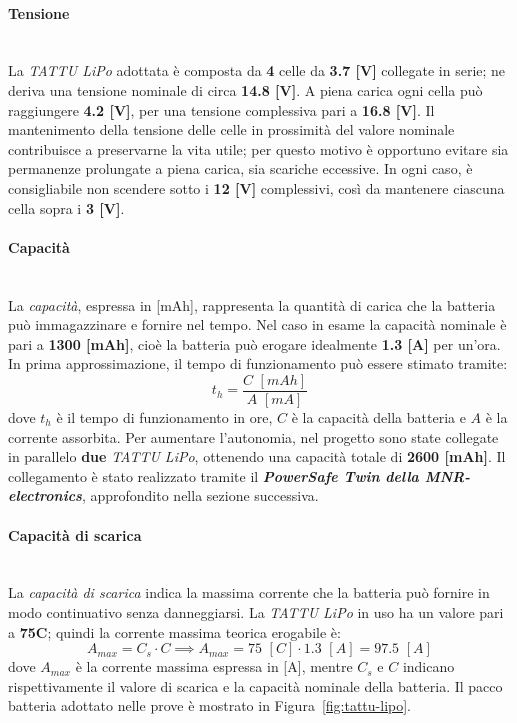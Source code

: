 \documentclass[11pt]{report}
\begin{document}
	\paragraph{\small{Tensione}}\mbox{}\\
	La \textit{TATTU LiPo} adottata è composta da \textbf{4} celle da \textbf{3.7 [V]} collegate in serie; ne deriva una tensione nominale di circa \textbf{14.8 [V]}. A piena carica ogni cella può raggiungere \textbf{4.2 [V]}, per una tensione complessiva pari a \textbf{16.8 [V]}.
	Il mantenimento della tensione delle celle in prossimità del valore nominale contribuisce a preservarne la vita utile; per questo motivo è opportuno evitare sia permanenze prolungate a piena carica, sia scariche eccessive. In ogni caso, è consigliabile non scendere sotto i \textbf{12 [V]} complessivi, così da mantenere ciascuna cella sopra i \textbf{3 [V]}.
	
	\paragraph{\small{Capacità}}\mbox{}\\
	La \textit{capacità}, espressa in [mAh], rappresenta la quantità di carica che la batteria può immagazzinare e fornire nel tempo. Nel caso in esame la capacità nominale è pari a \textbf{1300 [mAh]}, cioè la batteria può erogare idealmente \textbf{1.3 [A]} per un'ora. In prima approssimazione, il tempo di funzionamento può essere stimato tramite:
	\begin{equation}
		t_h = \frac{C\,\,[mAh]}{A\,\,[mA]}
	\end{equation}
	dove $t_h$ è il tempo di funzionamento in ore, $C$ è la capacità della batteria e $A$ è la corrente assorbita. Per aumentare l'autonomia, nel progetto sono state collegate in parallelo \textbf{due} \textit{TATTU LiPo}, ottenendo una capacità totale di \textbf{2600 [mAh]}. Il collegamento è stato realizzato tramite il \textit{\textbf{PowerSafe Twin della MNR-electronics}}, approfondito nella sezione successiva.
	
	\paragraph{\small{Capacità di scarica}}\mbox{}\\
	La \textit{capacità di scarica} indica la massima corrente che la batteria può fornire in modo continuativo senza danneggiarsi. La \textit{TATTU LiPo} in uso ha un valore pari a \textbf{75C}; quindi la corrente massima teorica erogabile è:
	\begin{equation}
		A_{max} = C_s\cdot C \implies A_{max} = 75\,\,[C]\cdot 1.3\,\,[A]= 97.5\,\,[A]
	\end{equation}
	dove $A_{max}$ è la corrente massima espressa in [A], mentre $C_s$ e $C$ indicano rispettivamente il valore di scarica e la capacità nominale della batteria. Il pacco batteria adottato nelle prove è mostrato in Figura~\ref{fig:tattu-lipo}.
	
\end{document}
